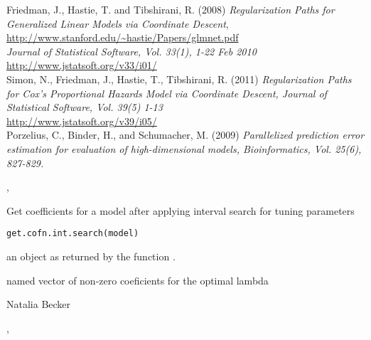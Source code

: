 \documentclass[letterpaper]{book}
\begin{document}
%
\begin{References}\relax
Friedman, J., Hastie, T. and Tibshirani, R. (2008)
\emph{Regularization Paths for Generalized Linear Models via Coordinate
Descent},   \url{http://www.stanford.edu/~hastie/Papers/glmnet.pdf}\\{}
\emph{Journal of Statistical Software, Vol. 33(1), 1-22 Feb 2010}\\{}
\url{http://www.jstatsoft.org/v33/i01/}\\{}
Simon, N., Friedman, J., Hastie, T., Tibshirani, R. (2011)
\emph{Regularization Paths for Cox's Proportional Hazards Model via
Coordinate Descent, Journal of Statistical Software, Vol. 39(5)
1-13}\\{}
\url{http://www.jstatsoft.org/v39/i05/}\\{}
Porzelius, C., Binder, H., and Schumacher, M. (2009) 
\emph{Parallelized prediction error estimation for evaluation of high-dimensional models,
Bioinformatics, Vol. 25(6), 827-829.}
\end{References}
%
\begin{SeeAlso}\relax
 , 
\end{SeeAlso}
%
\begin{Description}\relax
Get coefficients for a model after applying interval search for tuning parameters 
\end{Description}
%
\begin{Usage}
\begin{verbatim}
get.cofn.int.search(model)
\end{verbatim}
\end{Usage}
%
\begin{Arguments}
\begin{ldescription}
\item[\code{model}]  an object as returned by the function .
\end{ldescription}
\end{Arguments}
%
\begin{Value}
named vector of non-zero coeficients for the optimal lambda
\end{Value}
%
\begin{Author}\relax
Natalia Becker  \bsl{}
\end{Author}
%
\begin{SeeAlso}\relax
 , 
\end{SeeAlso}
\end{document}
